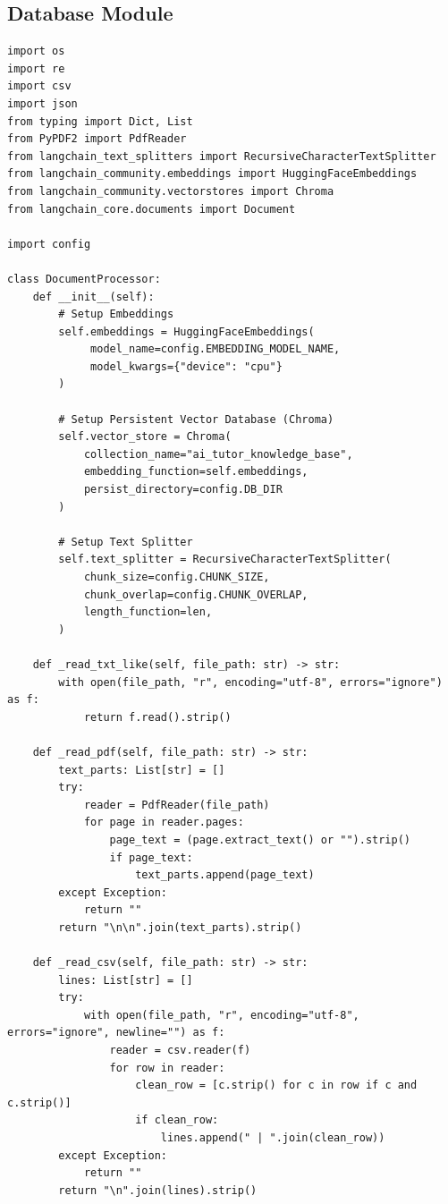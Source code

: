 \documentclass[12pt,a4paper]{article}
\begin{document}
\subsection*{Database Module}
\begin{lstlisting}[caption={database.py}]
import os
import re
import csv
import json
from typing import Dict, List
from PyPDF2 import PdfReader
from langchain_text_splitters import RecursiveCharacterTextSplitter
from langchain_community.embeddings import HuggingFaceEmbeddings
from langchain_community.vectorstores import Chroma
from langchain_core.documents import Document

import config

class DocumentProcessor:
    def __init__(self):
        # Setup Embeddings
        self.embeddings = HuggingFaceEmbeddings(
             model_name=config.EMBEDDING_MODEL_NAME,
             model_kwargs={"device": "cpu"}
        )
        
        # Setup Persistent Vector Database (Chroma)
        self.vector_store = Chroma(
            collection_name="ai_tutor_knowledge_base",
            embedding_function=self.embeddings,
            persist_directory=config.DB_DIR
        )

        # Setup Text Splitter
        self.text_splitter = RecursiveCharacterTextSplitter(
            chunk_size=config.CHUNK_SIZE,
            chunk_overlap=config.CHUNK_OVERLAP,
            length_function=len,
        )

    def _read_txt_like(self, file_path: str) -> str:
        with open(file_path, "r", encoding="utf-8", errors="ignore") as f:
            return f.read().strip()

    def _read_pdf(self, file_path: str) -> str:
        text_parts: List[str] = []
        try:
            reader = PdfReader(file_path)
            for page in reader.pages:
                page_text = (page.extract_text() or "").strip()
                if page_text:
                    text_parts.append(page_text)
        except Exception:
            return ""
        return "\n\n".join(text_parts).strip()

    def _read_csv(self, file_path: str) -> str:
        lines: List[str] = []
        try:
            with open(file_path, "r", encoding="utf-8", errors="ignore", newline="") as f:
                reader = csv.reader(f)
                for row in reader:
                    clean_row = [c.strip() for c in row if c and c.strip()]
                    if clean_row:
                        lines.append(" | ".join(clean_row))
        except Exception:
            return ""
        return "\n".join(lines).strip()


\end{lstlisting}
\end{document}
